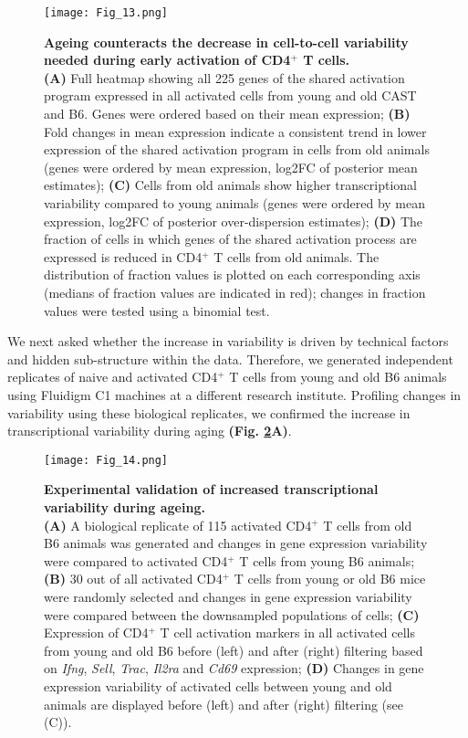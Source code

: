 \begin{figure}[!ht]
\centering
\texttt{[image: Fig\_13.png]}
\caption[Ageing destabilizes the CD4$^+$ T cell response]{\textbf{Ageing counteracts the decrease in cell-to-cell variability needed during early activation of CD4$^+$ T cells.} \\
\textbf{(A)} Full heatmap showing all 225 genes of the shared activation program expressed in all activated cells from young and old CAST and B6. Genes were ordered based on their mean expression; \textbf{(B)} Fold changes in mean expression indicate a consistent trend in lower expression of the shared activation program in cells from old animals (genes were ordered by mean expression, log2FC of posterior mean estimates); \textbf{(C)} Cells from old animals show higher transcriptional variability compared to young animals (genes were ordered by mean expression, log2FC of posterior over-dispersion estimates); \textbf{(D)} The fraction of cells in which genes of the shared activation process are expressed is reduced in CD4$^+$ T cells from old animals. The distribution of fraction values is plotted on each corresponding axis (medians of fraction values are indicated in red); changes in fraction values were tested using a binomial test.}
\label{fig1:variability_ageing}
\end{figure}

We next asked whether the increase in variability is driven by technical factors and hidden sub-structure within the data. Therefore, we generated independent replicates of naive and activated CD4$^+$ T cells from young and old B6 animals using Fluidigm C1 machines at a different research institute. Profiling changes in variability using these biological replicates, we confirmed the increase in transcriptional variability during aging \textbf{(Fig. \ref{fig1:validation}A)}.

\begin{figure}[!ht]
\centering
\texttt{[image: Fig\_14.png]}
\caption[Experimental validation of increased transcriptional variability during ageing]{\textbf{Experimental validation of increased transcriptional variability during ageing.} \\
\textbf{(A)} A biological replicate of 115 activated CD4$^+$ T cells from old B6 animals was generated and changes in gene expression variability were compared to activated CD4$^+$ T cells from young B6 animals; \textbf{(B)} 30 out of all activated CD4$^+$ T cells from young or old B6 mice were randomly selected and changes in gene expression variability were compared between the downsampled populations of cells; \textbf{(C)} Expression of CD4$^+$ T cell activation markers in all activated cells from young and old B6 before (left) and after (right) filtering based on \textit{Ifng}, \textit{Sell}, \textit{Trac}, \textit{Il2ra} and \textit{Cd69} expression; \textbf{(D)} Changes in gene expression variability of activated cells between young and old animals are displayed before (left) and after (right) filtering (see (C)).}
\label{fig1:validation}
\end{figure}

